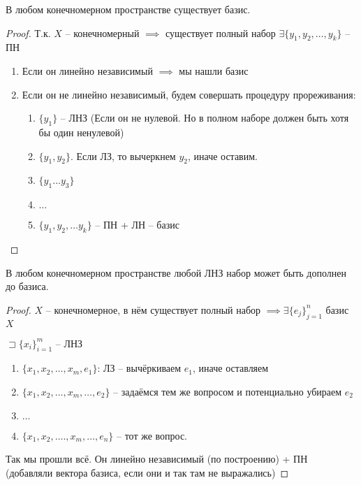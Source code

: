 \documentclass{book}
\theoremstyle{definition}
\begin{document}
 \begin{lemma}
     В любом конечномерном пространстве существует базис.
 \end{lemma}
 \begin{proof}
     Т.к. $X$ -- конечномерный  $\implies $ существует полный набор $\exists \{y_1, y_2, \ldots, y_k\}$ -- ПН
     \begin{enumerate}
         \item Если он линейно независимый $\implies $ мы нашли базис
         \item Если он не линейно независимый, будем совершать процедуру прореживания:
             \begin{enumerate}
                 \item $\{y_1\}$ -- ЛНЗ (Если он не нулевой. Но в полном наборе должен быть хотя бы один ненулевой)
                 \item $\{y_1,y_2\}$. Если ЛЗ, то вычеркнем $y_2$, иначе оставим.
                 \item $\{y_1\ldots y_3\}$
                 \item[] $\ldots$
                 \item $\{y_1,y_2,\ldots y_k\}$ -- ПН + ЛН -- базис
             \end{enumerate}
     \end{enumerate}
 \end{proof}
\begin{lemma}
    В любом конечномерном пространстве любой ЛНЗ набор может быть дополнен до базиса.   
\end{lemma}
\begin{proof}
    $X$ -- конечномерное, в нём существует полный набор  $\implies \exists \{e_j\}_{j=1}^n $ базис $X$ 

    $\sqsupset \{x_i\}_{i=1}^m$ -- ЛНЗ

    \begin{enumerate}
        \item $\{x_1, x_2, \ldots, x_m, e_1\}$: ЛЗ -- вычёркиваем $e_1$, иначе оставляем
        \item $\{x_1, x_2, \ldots, x_m,  \ldots, e_2\}$ -- задаёмся тем же вопросом и потенциально убираем $e_2$ 
        \item[] $\ldots$
        \item $\{x_1, x_2, \ldots., x_m, \ldots, e_n\}$ -- тот же вопрос.
    \end{enumerate}

    Так мы прошли всё. Он линейно независимый (по построению) + ПН (добавляли вектора базиса, если они и так там не выражались)
\end{proof}
\end{document}
